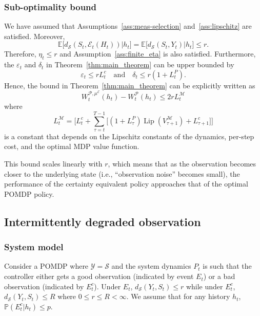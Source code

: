 \documentclass[letterpaper, 10pt]{IEEEtran}
\theoremstyle{plain}
\theoremstyle{nonumberplain}
\theoremstyle{plain}
\newcommand*\ALPHABET{\mathcal}
\newcommand*\PR{\mathds{P}}
\newcommand*\EXP{\mathds{E}}
\newcommand\dS{d_{\ALPHABET S}}
\newcommand\EST{\mathcal{E}}
\DeclareMathOperator{\Lip}{Lip}
\begin{document}
\subsubsection{Sub-optimality bound}
We have assumed that Assumptions~\ref{ass:meas-selection} and~\ref{ass:lipschitz} are satisfied. Moreover,
\[
    \EXP[ \dS(S_t, \EST_t(H_t)) | h_t ] = \EXP\bigl[d_{\ALPHABET S}(S_t,Y_t)| h_t\bigr] 
    \le r.
\]
Therefore, $\eta_t \le r$ and Assumption~\ref{ass:finite_eta} is also satisfied. Furthermore, the $\varepsilon_t$ and $\delta_t$ in Theorem~\ref{thm:main_theorem} can be upper bounded by
\[
    \varepsilon_t \le r L_t^c 
    \quad\text{and}\quad
    \delta_t \le r(1 + L_t^P).
\]
Hence, the bound in Theorem~\ref{thm:main_theorem} can be explicitly written as 
\begin{equation}
    W^{\ALPHABET P,\mu^\EST}_t(h_t) - W^{\ALPHABET P}_t(h_t) \le 2r L_t^{\ALPHABET M}
\end{equation}
where
\begin{equation}\label{eq:LT}
    L^{\ALPHABET M}_t = \biggl[L_t^c + \sum_{\tau = t}^{T-1}\bigl[ (1 + L_{\tau}^P) \Lip(V^{\ALPHABET M}_{\tau+1}) + L_{\tau+1}^c \bigr] \biggr]
\end{equation}
is a constant that depends on the Lipschitz constants of the dynamics, per-step cost, and the optimal MDP value function.

This bound scales linearly with $r$, which means that as the observation becomes closer to the underlying state (i.e., ``observation noise'' becomes small), the performance of the certainty equivalent policy approaches that of the optimal POMDP policy. 

\subsection{Intermittently degraded observation}

\subsubsection{System model}
Consider a POMDP where $\ALPHABET Y = \ALPHABET S$ and the system dynamics $P_t$ is such that the controller either gets a good observation (indicated by event $E_t$) or a bad observation (indicated by $E_t^c$). Under $E_t$, 
\(
    d_{\ALPHABET S}(Y_t, S_t) \le r
\)
while under $E_t^c$, 
\(
    d_{\ALPHABET S}(Y_t, S_t) \le R
\)
where $0 \le r \le R < \infty$.  We assume that for any history $h_t$, $\PR(E_t^c | h_t) \le p$. 
\end{document}
